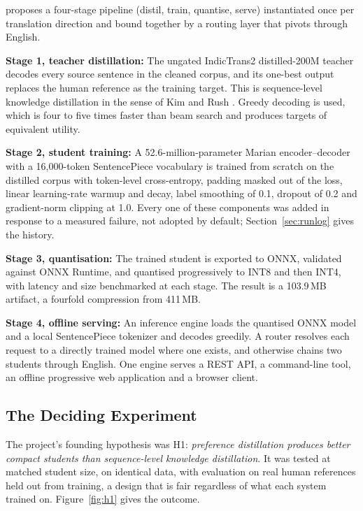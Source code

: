 \setu{} proposes a four-stage pipeline (distil, train, quantise, serve)
instantiated once per translation direction and bound together by a routing
layer that pivots through English.

\textbf{Stage 1, teacher distillation:} The ungated IndicTrans2 distilled-200M
teacher decodes every source sentence in the cleaned corpus, and its one-best
output replaces the human reference as the training target. This is
sequence-level knowledge distillation in the sense of Kim and Rush
\cite{ref:seqkd}. Greedy decoding is used, which is four to five times faster than
beam search and produces targets of equivalent utility.

\textbf{Stage 2, student training:} A 52.6-million-parameter Marian
encoder--decoder with a 16{,}000-token SentencePiece vocabulary is trained from
scratch on the distilled corpus with token-level cross-entropy, padding masked
out of the loss, linear learning-rate warmup and decay, label smoothing of 0.1,
dropout of 0.2 and gradient-norm clipping at 1.0. Every one of these components
was added in response to a measured failure, not adopted by default;
Section~\ref{sec:runlog} gives the history.

\textbf{Stage 3, quantisation:} The trained student is exported to ONNX,
validated against ONNX Runtime, and quantised progressively to INT8 and then
INT4, with latency and size benchmarked at each stage. The result is a 103.9\,MB
artifact, a fourfold compression from 411\,MB.

\textbf{Stage 4, offline serving:} An inference engine loads the quantised ONNX
model and a local SentencePiece tokenizer and decodes greedily. A router
resolves each request to a directly trained model where one exists, and
otherwise chains two students through English. One engine serves a REST API, a
command-line tool, an offline progressive web application and a browser client.

\subsection{The Deciding Experiment}
\label{subsec:deciding}

The project's founding hypothesis was H1: \emph{preference distillation produces
better compact students than sequence-level knowledge distillation}. It was
tested at matched student size, on identical data, with evaluation on real human
references held out from training, a design that is fair regardless of what
each system trained on. Figure~\ref{fig:h1} gives the outcome.

